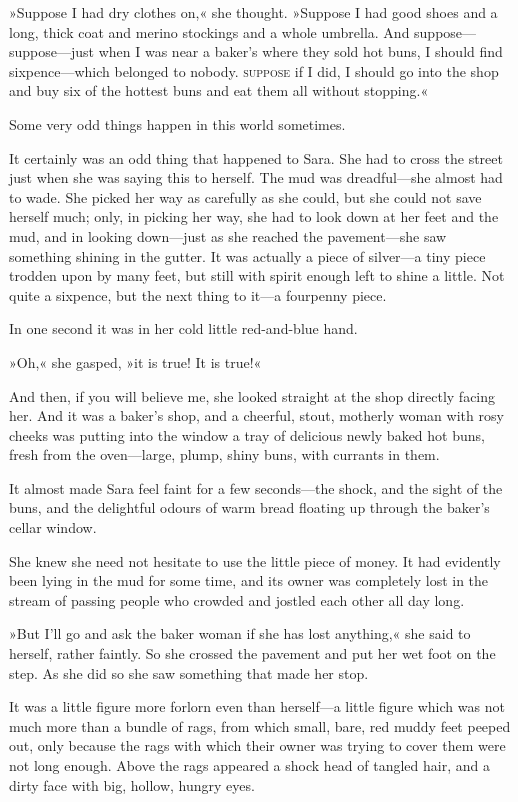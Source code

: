 »Suppose I had dry clothes on,« she thought. »Suppose I had good shoes and a long, thick coat and merino stockings and a whole umbrella. And suppose—suppose—just when I was near a baker's where they sold hot buns, I should find sixpence—which belonged to nobody. \textsc{suppose} if I did, I should go into the shop and buy six of the hottest buns and eat them all without stopping.«

Some very odd things happen in this world sometimes.

It certainly was an odd thing that happened to Sara. She had to cross the street just when she was saying this to herself. The mud was dreadful—she almost had to wade. She picked her way as carefully as she could, but she could not save herself much; only, in picking her way, she had to look down at her feet and the mud, and in looking down—just as she reached the pavement—she saw something shining in the gutter. It was actually a piece of silver—a tiny piece trodden upon by many feet, but still with spirit enough left to shine a little. Not quite a sixpence, but the next thing to it—a fourpenny piece.

In one second it was in her cold little red-and-blue hand.

»Oh,« she gasped, »it is true! It is true!«

And then, if you will believe me, she looked straight at the shop directly facing her. And it was a baker's shop, and a cheerful, stout, motherly woman with rosy cheeks was putting into the window a tray of delicious newly baked hot buns, fresh from the oven—large, plump, shiny buns, with currants in them.

It almost made Sara feel faint for a few seconds—the shock, and the sight of the buns, and the delightful odours of warm bread floating up through the baker's cellar window.

She knew she need not hesitate to use the little piece of money. It had evidently been lying in the mud for some time, and its owner was completely lost in the stream of passing people who crowded and jostled each other all day long.

»But I'll go and ask the baker woman if she has lost anything,« she said to herself, rather faintly. So she crossed the pavement and put her wet foot on the step. As she did so she saw something that made her stop.

It was a little figure more forlorn even than herself—a little figure which was not much more than a bundle of rags, from which small, bare, red muddy feet peeped out, only because the rags with which their owner was trying to cover them were not long enough. Above the rags appeared a shock head of tangled hair, and a dirty face with big, hollow, hungry eyes.

